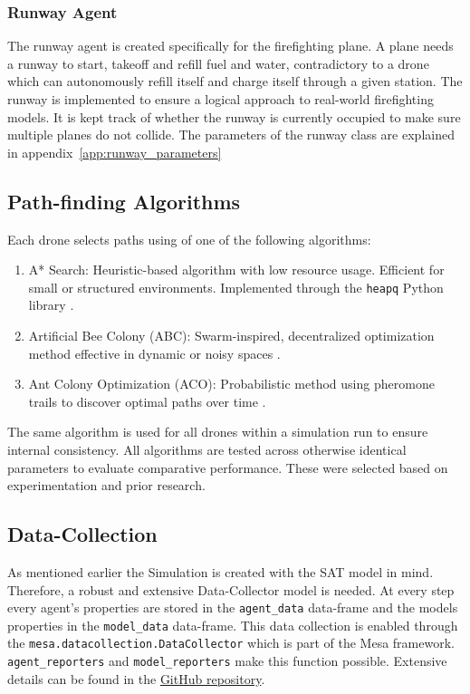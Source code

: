 \documentclass[twoside]{article}
\begin{document}
\subsubsection{Runway Agent}
\label{sec:RunwayClass}
The runway agent is created specifically for the firefighting plane. A plane needs a runway to start, takeoff and refill fuel and water, contradictory to a drone which can autonomously refill itself and charge itself through a given station. The runway is implemented to ensure a logical approach to real-world firefighting models. It is kept track of whether the runway is currently occupied to make sure multiple planes do not collide. The parameters of the runway class are explained in appendix~\ref{app:runway_parameters}

\subsection{Path-finding Algorithms}
Each drone selects paths using of one of the following algorithms:
\begin{enumerate}
    \item A* Search: Heuristic-based algorithm with low resource usage. Efficient for small or structured environments. Implemented through the \texttt{heapq} Python library \citep{python-heapq}.
    \item Artificial Bee Colony (ABC): Swarm-inspired, decentralized optimization method effective in dynamic or noisy spaces \citep{karaboga2007abc}.
    \item Ant Colony Optimization (ACO): Probabilistic method using pheromone trails to discover optimal paths over time \citep{ACO}.
\end{enumerate}

The same algorithm is used for all drones within a simulation run to ensure internal consistency. All algorithms are tested across otherwise identical parameters to evaluate comparative performance. These were selected based on experimentation and prior research.

\subsection{Data-Collection}

As mentioned earlier the Simulation is created with the SAT model in mind. Therefore, a robust and extensive Data-Collector model is needed. At every step every agent's properties are stored in the \texttt{agent\_data} data-frame and the models properties in the \texttt{model\_data} data-frame. This data collection is enabled through the \texttt{mesa.datacollection.DataCollector{}} which is part of the Mesa framework. \texttt{agent\_reporters} and \texttt{model\_reporters} make this function possible. Extensive details can be found in the \href{https://github.com/kaispeidel/Autonomous-Drone-Firefighting-Simulation}{GitHub repository}.
\end{document}
